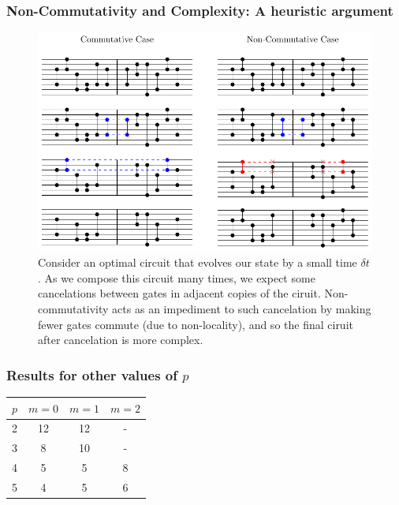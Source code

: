 \documentclass[10pt]{beamer}
\begin{document}
\begin{frame}
\frametitle{Non-Commutativity and Complexity: A heuristic argument}

\begin{figure}
    \begin{center}
        \includegraphics[scale=0.6]{cartoon}
    \end{center}
   \caption{Consider an optimal circuit that evolves our state by a small time $\delta t$. As we compose this circuit many times, we expect some cancelations between gates in adjacent copies of the ciruit. Non-commutativity acts as an impediment to such cancelation by making fewer gates commute (due to non-locality), and so the final ciruit after cancelation is more complex.} \label{fig:cartoon1}
\end{figure}

\end{frame}

\begin{frame}
\frametitle{Results for other values of $p$}

\begin{table}
    \centering
    \begin{tabular}{l | c  c  c }
        $p$ & $m=0$ & $m=1$ & $m=2$ \\
        \hline
        2 & 12 & 12 & - \\
        3 & 8 & 10 & - \\
        4 & 5 & 5 & 8 \\
        5 & 4 & 5 & 6 \\
    \end{tabular}
\end{table}

\end{frame}
\end{document}
